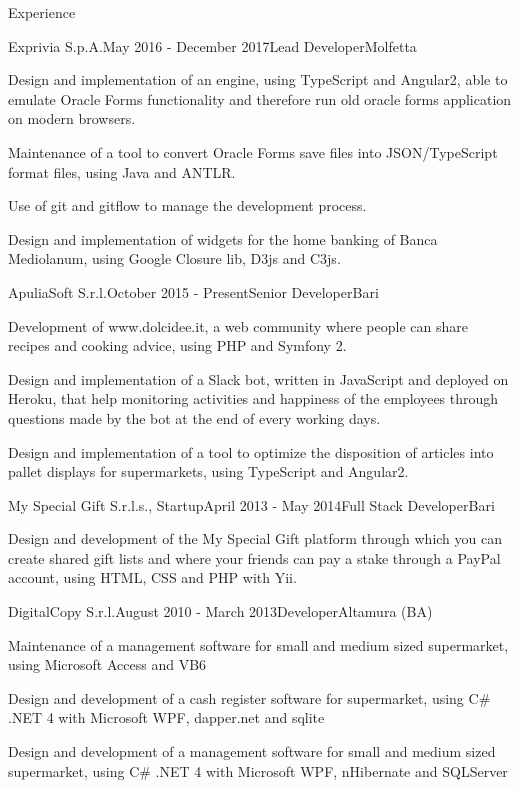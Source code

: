 \documentclass{resume} %
\begin{document}
\begin{rSection}{Experience}
\begin{rSubsection}{Exprivia S.p.A.}{May 2016 - December 2017}{Lead Developer}{Molfetta}
\item Design and implementation of an engine, using TypeScript and Angular2,
able to emulate Oracle Forms functionality and therefore run old oracle forms application on modern browsers.
\item Maintenance of a tool to convert Oracle Forms save files into JSON/TypeScript format files, using Java and ANTLR.
\item Use of git and gitflow to manage the development process.
\item Design and implementation of widgets for the home banking of Banca Mediolanum, using Google Closure lib, D3js and C3js.
\end{rSubsection}


\begin{rSubsection}{ApuliaSoft S.r.l.}{October 2015 - Present}{Senior Developer}{Bari}
\item Development of www.dolcidee.it, a web community where people can share recipes and cooking advice, using PHP and Symfony 2.
\item Design and implementation of a Slack bot, written in JavaScript and deployed on Heroku, that help monitoring activities and
happiness of the employees through questions made by the bot at the end of every working days.
\item Design and implementation of a tool to optimize the disposition of articles into pallet displays for supermarkets, using TypeScript and Angular2.
\end{rSubsection}


\begin{rSubsection}{My Special Gift S.r.l.s., Startup}{April 2013 - May 2014}{Full Stack Developer}{Bari}
\item Design and development of the My Special Gift platform through which you can create shared gift lists and where your friends can pay a stake through a PayPal account, using HTML, CSS and PHP with Yii.
\end{rSubsection}


\begin{rSubsection}{DigitalCopy S.r.l.}{August 2010 - March 2013}{Developer}{Altamura (BA)}
\item Maintenance of a management software for small and medium sized supermarket, using Microsoft Access and VB6
\item Design and development of a cash register software for supermarket, using C\# .NET 4 with Microsoft WPF, dapper.net and sqlite
\item Design and development of a management software for small and medium sized supermarket, using C\# .NET 4 with Microsoft WPF, nHibernate and SQLServer
\end{rSubsection}

\end{rSection}
\end{document}
